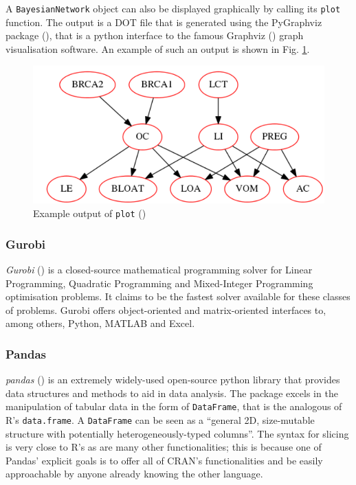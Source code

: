 A \texttt{BayesianNetwork} object can also be displayed graphically by calling its \texttt{plot} function.
The output is a DOT file that is generated using the PyGraphviz package (\cite{pygraphviz}), that is a python interface to the famous Graphviz (\cite{graphviz}) graph visualisation software.
An example of such an output is shown in Fig. \ref{fig:pomegranate_graph_example}.

\begin{figure}[htbp]
\centerline{\includegraphics[width=\columnwidth]{methodology/images/pomegranate_example}}
\caption{Example output of \texttt{plot} (\cite{pomegranatetutorial}) }
\label{fig:pomegranate_graph_example}
\end{figure}

\subsubsection{Gurobi}
\textit{Gurobi} (\cite{gurobi}) is a closed-source mathematical programming solver for Linear Programming, Quadratic Programming and Mixed-Integer Programming optimisation problems.
It claims to be the fastest solver available for these classes of problems.
Gurobi offers object-oriented and matrix-oriented interfaces to, among others, Python, MATLAB and Excel.

\subsubsection{Pandas}
\textit{pandas} (\cite{pandas}) is an extremely widely-used open-source python library that provides data structures and methods to aid in data analysis.
The package excels in the manipulation of tabular data in the form of \texttt{DataFrame}, that is the analogous of R's \texttt{data.frame}.
A \texttt{DataFrame} can be seen as a \enquote{general 2D, size-mutable structure with potentially heterogeneously-typed columns}.
The syntax for slicing is very close to R's as are many other functionalities; this is because one of Pandas' explicit goals is to offer all of CRAN's functionalities and be easily approachable by anyone already knowing the other language.

